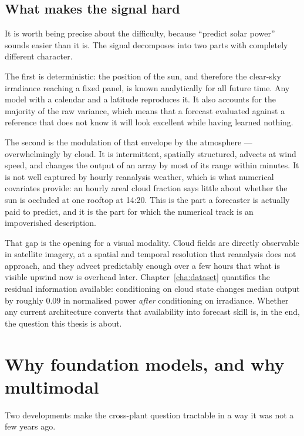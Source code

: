 \subsection{What makes the signal hard}

It is worth being precise about the difficulty, because ``predict solar power'' sounds easier
than it is. The signal decomposes into two parts with completely different character.

The first is deterministic: the position of the sun, and therefore the clear-sky irradiance
reaching a fixed panel, is known analytically for all future time. Any model with a calendar
and a latitude reproduces it. It also accounts for the majority of the raw variance, which
means that a forecast evaluated against a reference that does not know it will look excellent
while having learned nothing.

The second is the modulation of that envelope by the atmosphere --- overwhelmingly by cloud.
It is intermittent, spatially structured, advects at wind speed, and changes the output of an
array by most of its range within minutes. It is not well captured by hourly reanalysis
weather, which is what numerical covariates provide: an hourly areal cloud fraction says
little about whether the sun is occluded at one rooftop at 14:20. This is the part a
forecaster is actually paid to predict, and it is the part for which the numerical track is
an impoverished description.

That gap is the opening for a visual modality. Cloud fields are directly observable in
satellite imagery, at a spatial and temporal resolution that reanalysis does not approach,
and they advect predictably enough over a few hours that what is visible upwind now is
overhead later. Chapter~\ref{cha:dataset} quantifies the residual information available:
conditioning on cloud state changes median output by roughly 0.09 in normalised power
\emph{after} conditioning on irradiance. Whether any current architecture converts that
availability into forecast skill is, in the end, the question this thesis is about.

\section{Why foundation models, and why multimodal}
\label{sec:why-fm}

Two developments make the cross-plant question tractable in a way it was not a few years
ago.


